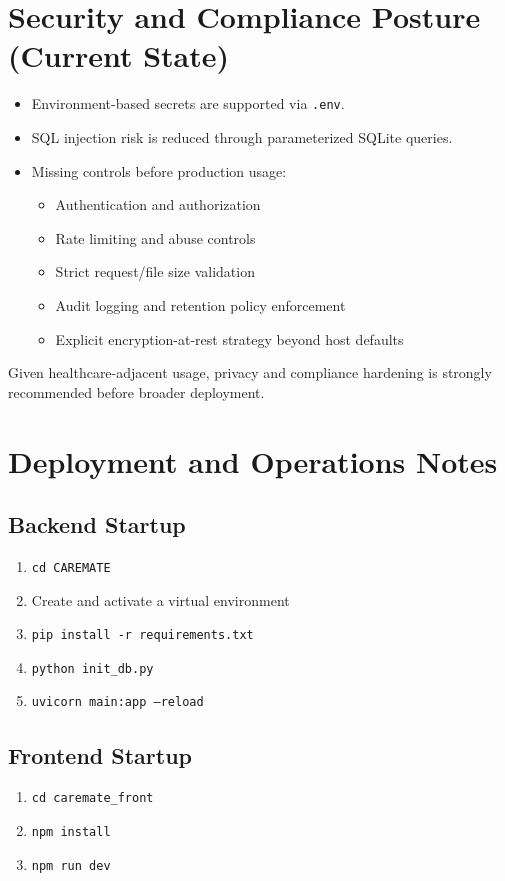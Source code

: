 \documentclass[12pt,a4paper]{article}
\begin{document}
\section{Security and Compliance Posture (Current State)}
\begin{itemize}
  \item Environment-based secrets are supported via \texttt{.env}.
  \item SQL injection risk is reduced through parameterized SQLite queries.
  \item Missing controls before production usage:
  \begin{itemize}
    \item Authentication and authorization
    \item Rate limiting and abuse controls
    \item Strict request/file size validation
    \item Audit logging and retention policy enforcement
    \item Explicit encryption-at-rest strategy beyond host defaults
  \end{itemize}
\end{itemize}

Given healthcare-adjacent usage, privacy and compliance hardening is strongly recommended before broader deployment.

\section{Deployment and Operations Notes}

\subsection{Backend Startup}
\begin{enumerate}
  \item \texttt{cd CAREMATE}
  \item Create and activate a virtual environment
  \item \texttt{pip install -r requirements.txt}
  \item \texttt{python init\_db.py}
  \item \texttt{uvicorn main:app --reload}
\end{enumerate}

\subsection{Frontend Startup}
\begin{enumerate}
  \item \texttt{cd caremate\_front}
  \item \texttt{npm install}
  \item \texttt{npm run dev}
\end{enumerate}
\end{document}
